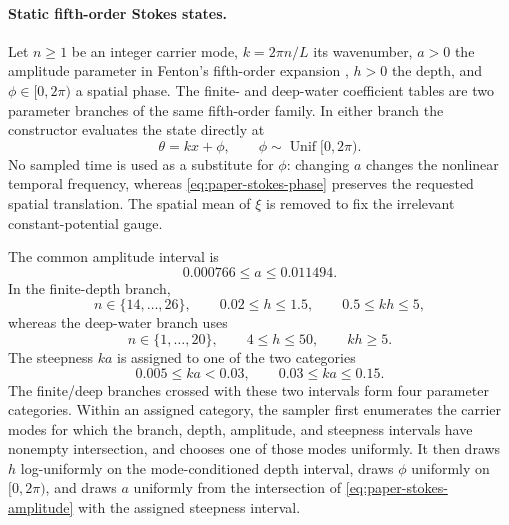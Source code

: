 \paragraph{Static fifth-order Stokes states.}
Let $n\geq1$ be an integer carrier mode, $k=2\pi n/L$ its wavenumber,
$a>0$ the amplitude parameter in Fenton's fifth-order expansion
\cite{fenton1985}, $h>0$ the depth, and
$\phi\in[0,2\pi)$ a spatial phase.  The finite- and deep-water coefficient
tables are two parameter branches of the same fifth-order family.  In either
branch the constructor evaluates the state directly at
\begin{equation}
  \theta=kx+\phi,
  \qquad \phi\sim\operatorname{Unif}[0,2\pi).
  \label{eq:paper-stokes-phase}
\end{equation}
No sampled time is used as a substitute for $\phi$: changing $a$ changes the
nonlinear temporal frequency, whereas \cref{eq:paper-stokes-phase} preserves
the requested spatial translation.  The spatial mean of $\xi$ is removed to
fix the irrelevant constant-potential gauge.

The common amplitude interval is
\begin{equation}
  0.000766\leq a\leq0.011494.
  \label{eq:paper-stokes-amplitude}
\end{equation}
In the finite-depth branch,
\begin{equation}
  n\in\{14,\ldots,26\},\qquad
  0.02\leq h\leq1.5,\qquad
  0.5\leq kh\leq5,
  \label{eq:paper-stokes-finite-support}
\end{equation}
whereas the deep-water branch uses
\begin{equation}
  n\in\{1,\ldots,20\},\qquad
  4\leq h\leq50,\qquad
  kh\geq5.
  \label{eq:paper-stokes-deep-support}
\end{equation}
The steepness $ka$ is assigned to one of the two categories
\begin{equation}
  0.005\leq ka<0.03,
  \qquad
  0.03\leq ka\leq0.15.
  \label{eq:paper-stokes-cells}
\end{equation}
The finite/deep branches crossed with these two intervals form four parameter
categories.  Within an assigned category, the sampler first enumerates the carrier
modes for which the branch, depth, amplitude, and steepness intervals have
nonempty intersection, and chooses one of those modes uniformly.  It then
draws \(h\) log-uniformly on the mode-conditioned depth interval, draws
\(\phi\) uniformly on \([0,2\pi)\), and draws \(a\) uniformly from the
intersection of \cref{eq:paper-stokes-amplitude} with the assigned steepness
interval.

